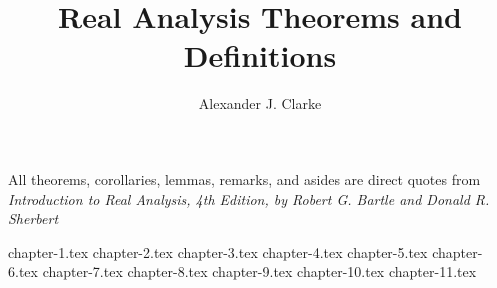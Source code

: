 \documentclass[12pt,letterpaper]{report}
\author{Alexander J. Clarke}
\title{Real Analysis Theorems and Definitions}
\begin{document}
\maketitle
\clearpage
\begin{center}
	\thispagestyle{empty}
	\vspace*{\fill}
	All theorems, corollaries, lemmas, remarks, and asides are direct quotes from\\

	\textit{Introduction to Real Analysis, 4th Edition, by Robert G. Bartle and Donald R. Sherbert}
	\vspace*{\fill}
\end{center}
\tableofcontents

{chapter-1.tex}
{chapter-2.tex}
{chapter-3.tex}
{chapter-4.tex}
{chapter-5.tex}
{chapter-6.tex}
{chapter-7.tex}
{chapter-8.tex}
{chapter-9.tex}
{chapter-10.tex}
{chapter-11.tex}
\end{document}
